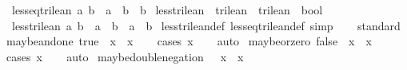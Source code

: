 \begin{isabellebody}
\ \ {\isachardoublequoteopen}less{\isacharunderscore}eq{\isacharunderscore}trilean\ a\ b\ {\isacharequal}\ {\isacharparenleft}a\ {\isacharplus}\ b\ {\isacharequal}\ b{\isacharparenright}{\isachardoublequoteclose}\isanewline
\isanewline
{}\isamarkupfalse%
\ less{\isacharunderscore}trilean\ {\isacharcolon}{\isacharcolon}\ {\isachardoublequoteopen}trilean\ {\isasymRightarrow}\ trilean\ {\isasymRightarrow}\ bool{\isachardoublequoteclose}\ \isanewline
\ \ {\isachardoublequoteopen}less{\isacharunderscore}trilean\ a\ b\ {\isacharequal}\ {\isacharparenleft}a\ {\isasymle}\ b\ {\isasymand}\ a\ {\isasymnoteq}\ b{\isacharparenright}{\isachardoublequoteclose}\isanewline
\isanewline
{}\isamarkupfalse%
\ less{\isacharunderscore}trilean{\isacharunderscore}def\ less{\isacharunderscore}eq{\isacharunderscore}trilean{\isacharunderscore}def\ {\isacharbrackleft}simp{\isacharbrackright}\isanewline
\isanewline
{}\isamarkupfalse%
\isanewline
%
\isadelimproof
\ \ %
\endisadelimproof
%
\isatagproof
{}\isamarkupfalse%
\ standard%
\endisatagproof
{\isafoldproof}%
%
\isadelimproof
\isanewline
%
\endisadelimproof
{}\isamarkupfalse%
\isanewline
\isanewline
{}\isamarkupfalse%
\ maybe{\isacharunderscore}and{\isacharunderscore}one{\isacharcolon}\ {\isachardoublequoteopen}true\ {\isasymand}\isactrlsub {\isacharquery}\ x\ {\isacharequal}\ x{\isachardoublequoteclose}\isanewline
%
\isadelimproof
\ \ %
\endisadelimproof
%
\isatagproof
{}\isamarkupfalse%
\ {\isacharparenleft}cases\ x{\isacharparenright}\isanewline
\ \ \isamarkupfalse%
\ auto%
\endisatagproof
{\isafoldproof}%
%
\isadelimproof
\isanewline
%
\endisadelimproof
\isanewline
{}\isamarkupfalse%
\ maybe{\isacharunderscore}or{\isacharunderscore}zero{\isacharcolon}\ {\isachardoublequoteopen}false\ {\isasymor}\isactrlsub {\isacharquery}\ x\ {\isacharequal}\ x{\isachardoublequoteclose}\isanewline
%
\isadelimproof
\ \ %
\endisadelimproof
%
\isatagproof
{}\isamarkupfalse%
\ {\isacharparenleft}cases\ x{\isacharparenright}\isanewline
\ \ \isamarkupfalse%
\ auto%
\endisatagproof
{\isafoldproof}%
%
\isadelimproof
\isanewline
%
\endisadelimproof
\isanewline
{}\isamarkupfalse%
\ maybe{\isacharunderscore}double{\isacharunderscore}negation{\isacharcolon}\ {\isachardoublequoteopen}{\isasymnot}\isactrlsub {\isacharquery}\ {\isasymnot}\isactrlsub {\isacharquery}\ x\ {\isacharequal}\ x{\isachardoublequoteclose}\isanewline
%
\isadelimproof
\ \ %

\end{isabellebody}
